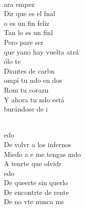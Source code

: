 \documentclass[12pt]{article}
\begin{document}
\begin{multicols*}{2}
        \newpage
        
        \begin{cancion}[Miedo][M Clan]%
                    \\
                ara empez\\
                Dir que es el fnal\\
                o es un fin feliz\\
                Tan lo es un finl \\
                Pero pare ser \\
                que yano hay vuelta atrá    \\
        \jump
                ólo te \\
                Diantes de carbn \\
                ompí tu ndo en dos\\
                Rom tu corazn  \\
                Y ahora tu ndo está\\
                burándose de i       \\\jump\\
                \begin{chorus}%
                edo\\
                De volvr a los infernos\\
                Miedo a e me tengas mdo\\
                A tenrte que olvidr      \\
                edo\\
                De queerte sin querlo\\
                De encontrte de rente\\
                De no vte nunca ms \\
                \end{chorus}%

\end{cancion}
\end{multicols*}
\end{document}
